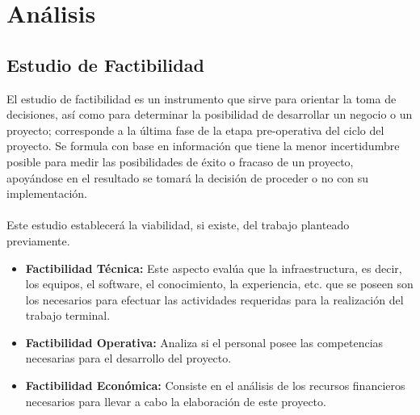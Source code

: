 \documentclass[12pt, a4paper, titlepage]{report}
\begin{document}

	\chapter{\textcolor{azulescom}{Análisis}}
	    
    	\section{Estudio de Factibilidad}
    	El estudio de factibilidad es un instrumento que sirve para orientar la toma de decisiones, así como para determinar la posibilidad de desarrollar un negocio o un proyecto; corresponde a la última fase de la etapa pre-operativa del ciclo del proyecto. Se formula con base en información que tiene la menor incertidumbre posible para medir las posibilidades de éxito o fracaso de un proyecto, apoyándose en el resultado se tomará la decisión de proceder o no con su implementación.\\\\ 
    	Este estudio establecerá la viabilidad, si existe, del trabajo planteado previamente.
    	\begin{itemize}
    		\item \textbf{Factibilidad Técnica:} Este aspecto evalúa que la infraestructura, es decir, los equipos, el software, el conocimiento, la experiencia, etc. que se poseen son los necesarios para efectuar las actividades requeridas para la realización del trabajo terminal.
    		\item \textbf{Factibilidad Operativa:} Analiza si el personal posee las competencias necesarias para el desarrollo del proyecto.
    		\item \textbf{Factibilidad Econ\'omica:} Consiste en el análisis de los recursos financieros necesarios para llevar a cabo la elaboraci\'on de este proyecto.
    	\end{itemize}
\end{document}
